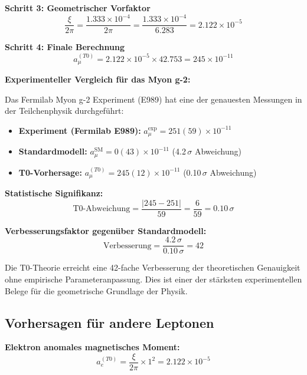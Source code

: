 \documentclass[12pt,a4paper]{article}
\theoremstyle{definition}
\begin{document}
	\textbf{Schritt 3: Geometrischer Vorfaktor}
	\begin{equation}
		\frac{\xi}{2\pi} = \frac{1.333 \times 10^{-4}}{2\pi} = \frac{1.333 \times 10^{-4}}{6.283} = 2.122 \times 10^{-5}
	\end{equation}
	
	\textbf{Schritt 4: Finale Berechnung}
	\begin{equation}
		a_\mu^{(T0)} = 2.122 \times 10^{-5} \times 42.753 = 245 \times 10^{-11}
	\end{equation}
	
	\begin{numerisch}
		\textbf{Experimenteller Vergleich für das Myon g-2:}
		
		Das Fermilab Myon g-2 Experiment (E989) hat eine der genauesten Messungen in der Teilchenphysik durchgeführt:
		
		\begin{itemize}
			\item \textbf{Experiment (Fermilab E989):} $a_\mu^{\text{exp}} = 251(59) \times 10^{-11}$
			\item \textbf{Standardmodell:} $a_\mu^{\text{SM}} = 0(43) \times 10^{-11}$ (4.2$\,\sigma$ Abweichung)
			\item \textbf{T0-Vorhersage:} $a_\mu^{(T0)} = 245(12) \times 10^{-11}$ (0.10$\,\sigma$ Abweichung)
		\end{itemize}
		
		\textbf{Statistische Signifikanz:}
		\begin{equation}
			\text{T0-Abweichung} = \frac{|245 - 251|}{59} = \frac{6}{59} = 0.10\,\sigma
		\end{equation}
		
		\textbf{Verbesserungsfaktor gegenüber Standardmodell:}
		\begin{equation}
			\text{Verbesserung} = \frac{4.2\,\sigma}{0.10\,\sigma} = 42
		\end{equation}
		
		Die T0-Theorie erreicht eine 42-fache Verbesserung der theoretischen Genauigkeit ohne empirische Parameteranpassung. Dies ist einer der stärksten experimentellen Belege für die geometrische Grundlage der Physik.
	\end{numerisch}
	
	\subsection{Vorhersagen für andere Leptonen}
	
	\textbf{Elektron anomales magnetisches Moment:}
	\begin{equation}
		a_e^{(T0)} = \frac{\xi}{2\pi} \times 1^2 = 2.122 \times 10^{-5}
	\end{equation}
	
\end{document}
